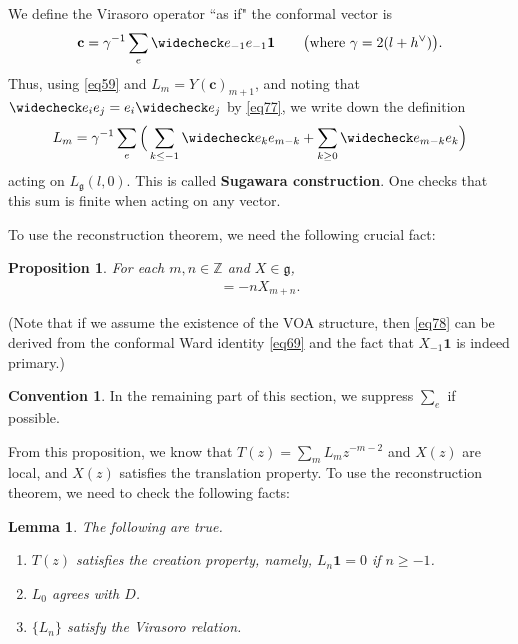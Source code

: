 \documentclass[12pt,a4paper,notitlepage]{article}
\theoremstyle{definition}
\newtheorem{cv}[df]{Convention}
\theoremstyle{plain}
\newtheorem{pp}[df]{Proposition}
\newtheorem{lm}[df]{Lemma}
\newcommand{\wch}{\widecheck}
\newcommand{\id}{\mathbf{1}}
\newcommand{\gk}{\mathfrak g}
\newcommand{\Zbb}{\mathbb Z}
\newcommand{\cbf}{\mathbf c}
\numberwithin{equation}{section}
\begin{document}
\subsection{}

We define the Virasoro operator ``as if" the conformal vector is
\begin{align}
	\cbf=\gamma^{-1}\sum_e\wch e_{-1}e_{-1}\id\qquad\big(\text{where }\gamma=2(l+h^\vee)\big).\label{eq79}
\end{align}
Thus, using \eqref{eq59} and $L_m=Y(\cbf)_{m+1}$, and noting that $\wch e_ie_j=e_i\wch e_j$ by \eqref{eq77}, we write down the definition
\begin{align}
L_m=\gamma^{-1}\sum_e\Big(\sum_{k\leq-1} \wch e_ke_{m-k}+\sum_{k\geq0} \wch e_{m-k}e_k\Big)
\end{align}
acting on $L_\gk(l,0)$. This is called \textbf{Sugawara construction}. One checks that this sum is finite when acting on any vector. 


To use the reconstruction theorem, we need the following crucial fact:
\begin{pp}\label{lb48}
For each $m,n\in\Zbb$ and $X\in\gk$,
\begin{align}
[L_m,X_n]=-nX_{m+n}.	\label{eq78}
\end{align}
\end{pp}
(Note that if we assume the existence of the VOA structure, then \eqref{eq78} can be derived from the conformal Ward identity \eqref{eq69} and the fact that $X_{-1}\id$ is indeed primary.)


\begin{cv}\label{lb49}
In the remaining part of this section, we suppress $\sum_e$ if possible.
\end{cv}
From this proposition, we know that $T(z)=\sum_m L_mz^{-m-2}$ and $X(z)$ are local, and $X(z)$ satisfies the translation property. To use the reconstruction theorem, we need to check the following facts:

\begin{lm}
The following are true.
\begin{enumerate}[label=(\alph*)]
\item $T(z)$ satisfies the creation property, namely, $L_n\id=0$ if $n\geq-1$.
\item $L_0$ agrees with $D$.
\item $\{L_n\}$ satisfy the Virasoro relation.
\end{enumerate}
\end{lm}
\end{document}

